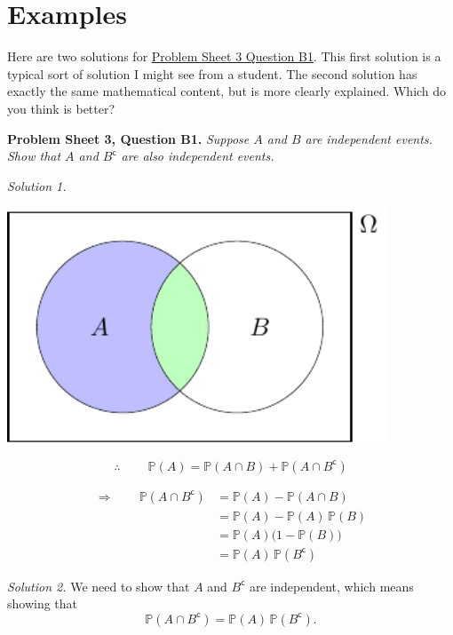 \documentclass[
  a4paper,
]{book}
\theoremstyle{definition}
\theoremstyle{definition}
\theoremstyle{definition}
\theoremstyle{definition}
\theoremstyle{remark}
\begin{document}
\hypertarget{writing-ex}{%
\section*{Examples}\label{writing-ex}}

Here are two solutions for \protect\hyperlink{P3-long}{Problem Sheet 3 Question B1}. This first solution is a typical sort of solution I might see from a student. The second solution has exactly the same mathematical content, but is more clearly explained. Which do you think is better?

\textbf{Problem Sheet 3, Question B1.} \emph{Suppose \(A\) and \(B\) are independent events. Show that \(A\) and \(B^\mathsf{c}\) are also independent events.}

\emph{Solution 1.}

\begin{center}\includegraphics[width=320pt]{math1710_files/figure-latex/writing-pic-0-1} \end{center}

\[ \therefore \ \qquad \mathbb P(A) = \mathbb P(A \cap B) + \mathbb P(A \cap B^\mathsf{c})  \]

\begin{align*}
\Rightarrow \qquad \mathbb P(A \cap B^\mathsf{c})
&= \mathbb P(A) - \mathbb P(A \cap B) \\
&= \mathbb P(A) - \mathbb P(A)\,\mathbb P(B) \\
&= \mathbb P(A) \big(1 - \mathbb P(B)\big) \\
&= \mathbb P(A) \, \mathbb P(B^\mathsf{c}) 
\end{align*}

\emph{Solution 2.}
We need to show that \(A\) and \(B^\mathsf{c}\) are independent, which means showing that
\[ \mathbb P(A \cap B^\mathsf{c}) = \mathbb P(A) \, \mathbb P(B^\mathsf{c}) . \tag{$*$} \]
\end{document}
